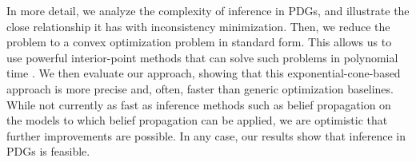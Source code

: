 \documentclass[twoside]{article}
\begin{document}
In more detail,
we analyze the complexity of inference in PDGs, and illustrate
the close relationship it has with inconsistency minimization.
Then, we reduce the problem to a convex optimization problem in standard
form.
This allows us to use powerful interior-point methods
that can solve such problems in polynomial time \parencite{dahl2022primal}. 
We then evaluate our approach, showing 
that this exponential-cone-based approach is more precise
and, often, faster than generic optimization baselines.
While not currently as fast as inference methods such as belief
propagation on the models to which belief propagation can be applied,
we are optimistic that further improvements are possible.
In any case, our results show that inference in PDGs is feasible.
\end{document}
